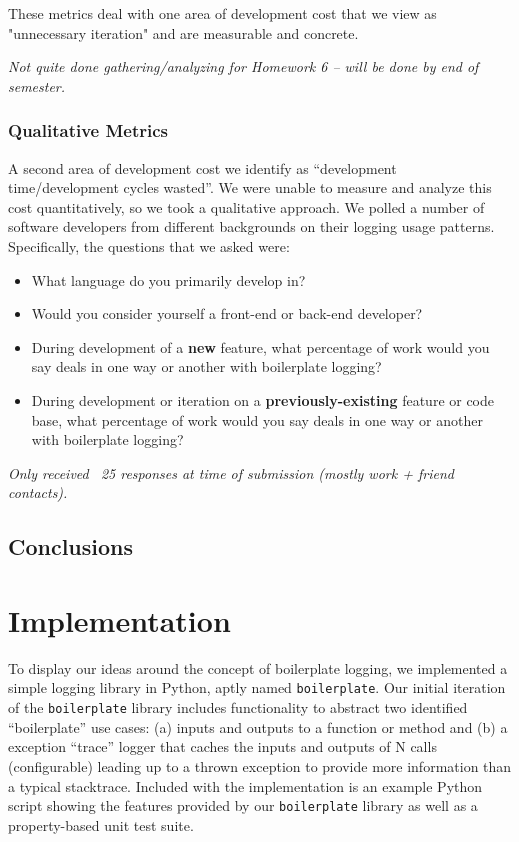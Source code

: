 \documentclass[acmsmall,review,authorversion]{acmart}
\newcommand{\code}[1]{\lstinline[basicstyle=\ttfamily\small]~#1~}
\begin{document}
These metrics deal with one area of development cost that we view as "unnecessary iteration" and are measurable and concrete.

\textit{Not quite done gathering/analyzing for Homework 6 -- will be done by end of semester.}

\subsubsection{Qualitative Metrics}

A second area of development cost we identify as ``development time/development cycles wasted''. We were unable to measure and analyze this cost quantitatively, so we took a qualitative approach. We polled a number of software developers from different backgrounds on their logging usage patterns. Specifically, the questions that we asked were:

\begin{itemize}
    \item What language do you primarily develop in?
    \item Would you consider yourself a front-end or back-end developer?
    \item During development of a \textbf{new} feature, what percentage of work would you say deals in one way or another with boilerplate logging?
    \item During development or iteration on a \textbf{previously-existing} feature or code base, what percentage of work would you say deals in one way or another with boilerplate logging?
\end{itemize}

\textit{Only received ~25 responses at time of submission (mostly work + friend contacts).}

\subsection{Conclusions}

\section{Implementation}

To display our ideas around the concept of boilerplate logging, we implemented a simple logging library in Python, aptly named \code{boilerplate}. Our initial iteration of the \code{boilerplate} library includes functionality to abstract two identified ``boilerplate'' use cases: (a) inputs and outputs to a function or method and (b) a exception ``trace'' logger that caches the inputs and outputs of N calls (configurable) leading up to a thrown exception to provide more information than a typical stacktrace. Included with the implementation is an example Python script showing the features provided by our \code{boilerplate} library as well as a property-based unit test suite.
\end{document}
